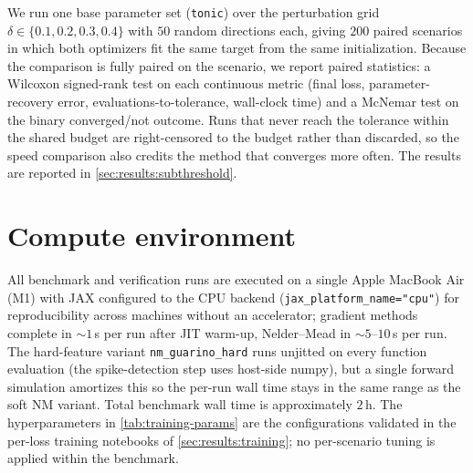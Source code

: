 We run one base parameter set (\texttt{tonic}) over the perturbation grid $\delta\in\{0.1,0.2,0.3,0.4\}$ with $50$ random directions each,
giving $200$ paired scenarios in which both optimizers fit the same target from the same initialization.
Because the comparison is fully paired on the scenario, we report paired statistics:
a Wilcoxon signed-rank test on each continuous metric (final loss, parameter-recovery error, evaluations-to-tolerance, wall-clock time)
and a McNemar test on the binary converged/not outcome.
Runs that never reach the tolerance within the shared budget are right-censored to the budget rather than discarded, so the speed comparison also credits the method that converges more often.
The results are reported in \cref{sec:results:subthreshold}.

\section{Compute environment}\label{sec:method:compute-environment}
All benchmark and verification runs are executed on a single Apple MacBook Air (M1) with JAX configured to the CPU backend (\texttt{jax\_platform\_name="cpu"}) for reproducibility across machines without an accelerator;
gradient methods complete in $\sim 1$\,s per run after \gls{JIT} warm-up, Nelder--Mead in $\sim 5$--$10$\,s per run.
The hard-feature variant \texttt{nm\_guarino\_hard} runs unjitted on every function evaluation (the spike-detection step uses host-side numpy), but a single forward simulation amortizes this so the per-run wall time stays in the same range as the soft NM variant.
Total benchmark wall time is approximately $2$\,h.
The hyperparameters in \cref{tab:training-params} are the configurations validated in the per-loss training notebooks of \cref{sec:results:training};
no per-scenario tuning is applied within the benchmark.
